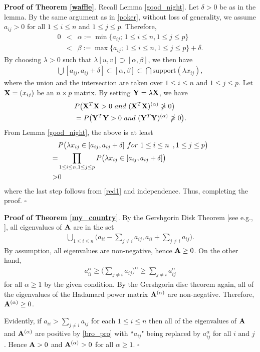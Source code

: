 \documentclass[conference,letterpaper]{IEEEtran}
\numberwithin{equation}{section}
\newcommand{\lbl}{\label}
\newcommand{\bd}{\bold}
\newcommand{\beaa}{\begin{eqnarray*}}
\newcommand{\eeaa}{\end{eqnarray*}}
\newcommand{\bea}{\begin{eqnarray}}
\newcommand{\eea}{\end{eqnarray}}
\begin{document}
\noindent\textbf{Proof of Theorem \ref{waffle}}. Recall Lemma \ref{good_night}. Let $\delta >0$ be as in the lemma. By the same argument as in \eqref{poker}, without loss of generality, we assume  $a_{ij}>0$ for all $1\leq i\leq n$ and $1\leq j \leq p.$ Therefore,
\beaa
0&<&\alpha:=\min\{a_{ij};\, 1\leq i \leq n, 1\leq j \leq p\}\\
&<& \beta:=\max\{a_{ij};\, 1\leq i\leq n, 1\leq j \leq p\}+\delta.
\eeaa
By choosing $\lambda>0$ such that $\lambda [u, v]\supset [\alpha , \beta]$, we then have
\bea\lbl{red1}
\bigcup [a_{ij}, a_{ij}+\delta] \subset [\alpha, \beta]\subset \bigcap   \mbox{support}(\lambda x_{ij}),
\eea
where the union and the intersection are taken over $1\leq i\leq n$ and $1\leq j \leq p.$ Let $\bd{X}=(x_{ij})$ be an $n\times p $ matrix.
By setting $\bd{Y}=\lambda\bd{X}$, we have
\beaa
& P\big(\bd{X}^T\bd{X}>0\ \mbox{and}\ (\bd{X}^T\bd{X})^{(\alpha)}\ngeqslant 0\big)\\
& =  P\big(\bd{Y}^T\bd{Y}>0\ \mbox{and}\ (\bd{Y}^T\bd{Y})^{(\alpha)}\ngeqslant 0\big).
\eeaa
From Lemma \ref{good_night}, the above is at least
\begin{align}\notag
& P\big(\lambda x_{ij}\in [a_{ij}, a_{ij}+\delta]\ \mbox{for}\ 1\leq i\leq n\ \,, 1\leq j \leq p\big)\\ \notag
=& \prod_{1\leq i\leq n, 1\leq j \leq p}P\big(\lambda x_{ij}\in [a_{ij}, a_{ij}+\delta]\big)\\\notag
>& 0\notag
\end{align}
where the last step follows from \eqref{red1} and independence. 
Thus, completing the proof. \hfill$\square$

\medskip

\noindent\textbf{Proof of Theorem \ref{my_country}}. By the Gershgorin Disk Theorem [see e.g., \cite{horn1985}], all eigenvalues of $\bd{A}$ are in the set
\bea\lbl{bro_pro}
\bigcup_{1\leq i \leq n}\Big(a_{ii}- \sum_{j\ne i}a_{ij}, a_{ii}+ \sum_{j\ne i}a_{ij}\Big).
\eea
By assumption, all eigenvalues are non-negative, hence $\bd{A}\geq 0$. On the other hand,
\beaa
a_{ii}^{\alpha}\geq  \Big(\sum_{j\ne i}a_{ij}\Big)^{\alpha}\geq \sum_{j\ne i}a_{ij}^{\alpha}
\eeaa
for all $\alpha\geq 1$ by the given condition. By the Gershgorin disc theorem again, all of the eigenvalues of the Hadamard power matrix $\bd{A}^{(\alpha)}$ are non-negative. Therefore,  $\bd{A}^{(\alpha)}\geq  0$.

Evidently, if $a_{ii}>  \sum_{j\ne i}a_{ij}$ for each $1\leq i\leq n$ then all of the eigenvalues of  $\bd{A}$  and $\bd{A}^{(\alpha)}$ are positive by \eqref{bro_pro} with ``$a_{ij}$" being replaced by $a_{ij}^{\alpha}$ for all $i$ and $j$. Hence $\bd{A} > 0$ and $\bd{A}^{(\alpha)}> 0$ for all $\alpha\geq 1.$ \hfill$\square$\\
\end{document}
